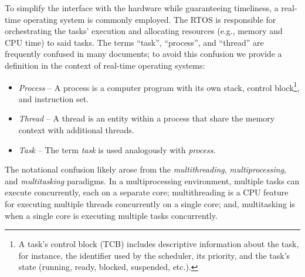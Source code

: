 To simplify the interface with the hardware while guaranteeing timeliness, a real-time operating system is commonly employed.
The RTOS is responsible for orchestrating the tasks' execution and allocating resources (e.g., memory and CPU time) to said tasks.
The terms ``task'', ``process'', and ``thread'' are frequently confused in many documents; to avoid this confusion we provide a definition in the context of real-time operating systems:
%
\begin{itemize}
    \item \emph{Process} -- A process is a computer program with its own stack, control block\footnote{A task's control block (TCB) includes descriptive information about the task, for instance, the identifier used by the scheduler, its priority, and the task's state (running, ready, blocked, suspended, etc.).}, and instruction set.

    \item \emph{Thread} -- A thread is an entity within a process that share the memory context with additional threads.

    \item \emph{Task} -- The term \emph{task} is used analogously with \emph{process}.
\end{itemize}
%
The notational confusion likely arose from the \emph{multithreading}, \emph{multiprocessing}, and \emph{multitasking} paradigms.
In a multiprocessing environment, multiple tasks can execute concurrently, each on a separate core; multithreading is a CPU feature for executing multiple threads concurrently on a single core; and, multitasking is when a single core is executing multiple tasks concurrently.

